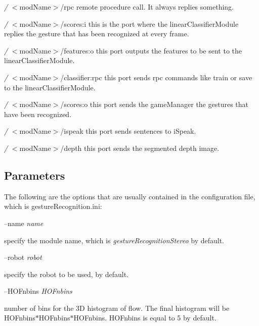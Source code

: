 \begin{DoxyItemize}
\item {\itshape /} $<$mod\+Name$>$/rpc remote procedure call. It always replies something.
\item {\itshape /} $<$mod\+Name$>$/scores\+:i this is the port where the linear\+Classifier\+Module replies the gesture that has been recognized at every frame.
\item {\itshape /} $<$mod\+Name$>$/features\+:o this port outputs the features to be sent to the linear\+Classifier\+Module.
\item {\itshape /} $<$mod\+Name$>$/classifier\+:rpc this port sends rpc commands like train or save to the linear\+Classifier\+Module.
\item {\itshape /} $<$mod\+Name$>$/scores\+:o this port sends the game\+Manager the gestures that have been recognized.
\item {\itshape /} $<$mod\+Name$>$/ispeak this port sends sentences to i\+Speak.
\item {\itshape /} $<$mod\+Name$>$/depth this port sends the segmented depth image.
\end{DoxyItemize}\hypertarget{group__gestureRecognitionStereo_parameters_sec}{}\subsection{Parameters}\label{group__gestureRecognitionStereo_parameters_sec}
The following are the options that are usually contained in the configuration file, which is gesture\+Recognition.\+ini\+:

--name {\itshape name} 
\begin{DoxyItemize}
\item specify the module name, which is {\itshape gesture\+Recognition\+Stereo} by default.
\end{DoxyItemize}

--robot {\itshape robot} 
\begin{DoxyItemize}
\item specify the robot to be used,  by default.
\end{DoxyItemize}

--H\+O\+Fnbins {\itshape H\+O\+Fnbins} 
\begin{DoxyItemize}
\item number of bins for the 3D histogram of flow. The final histogram will be H\+O\+Fnbins$\ast$\+H\+O\+Fnbins$\ast$\+H\+O\+Fnbins. H\+O\+Fnbins is equal to 5 by default.
\end{DoxyItemize}

